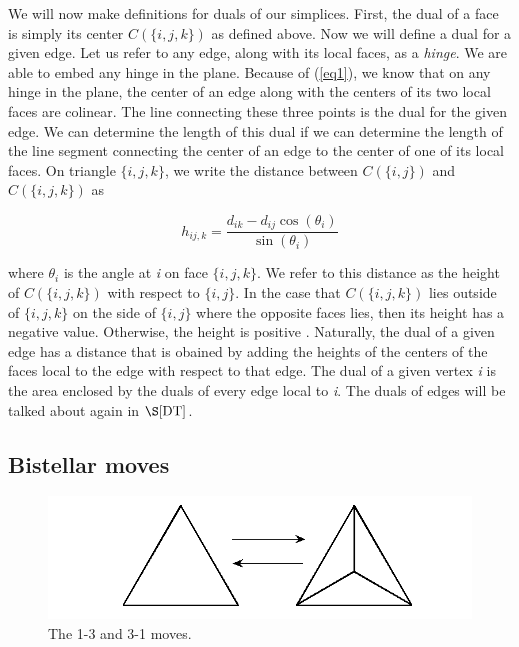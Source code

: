 \documentclass[12pt]{article}
\begin{document}
 We will now make definitions for duals of our simplices. First, the dual of a face is simply its center $C(\{i, j, k\})$ as defined above. Now we will define a dual for a given edge. Let us refer to any edge, along with its local faces, as a \textit{hinge}. We are able to embed any hinge in the plane. Because of (\ref{eq1}), we know that on any hinge in the plane, the center of an edge along with the centers of its two local faces are colinear. The line connecting these three points is the dual for the given edge. We can determine the length of this dual if we can determine the length of the line segment connecting the center of an edge to the center of one of its local faces. On triangle $\{i, j, k\}$, we write the distance between $C(\{i, j\})$ and $C(\{i, j, k\})$ as 

\begin{equation}
\label{eq3}
h_{ij,k} = \frac{d_{ik} - d_{ij}\cos(\theta_i)}{\sin(\theta_i)}
\end{equation}

 where $\theta_i$ is the angle at \textit{i} on face $\{i, j, k\}$. We refer to this distance as the height of $C(\{i, j, k\})$ with respect to $\{i, j\}$. In the case that $C(\{i, j, k\})$ lies outside of $\{i, j, k\}$ on the side of $\{i, j\}$ where the opposite faces lies, then its height has a negative value. Otherwise, the height is positive \cite{Dave}. Naturally, the dual of a given edge has a distance that is obained by adding the heights of the centers of the faces local to the edge with respect to that edge. The dual of a given vertex \textit{i} is the area enclosed by the duals of every edge local to \textit{i}. The duals of edges will be talked about again in $\S\ref{DT}$.

\subsection{Bistellar moves}

\begin{figure}
\centering
\includegraphics[scale = 0.8]{Pictures/Flip1331.png}
\caption{The 1-3 and 3-1 moves.}
\label{fig:flip2}
\end{figure}
\end{document}
